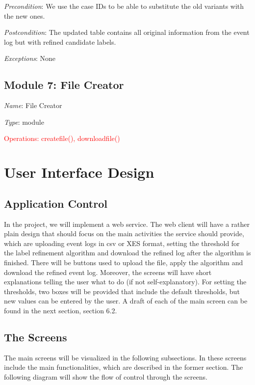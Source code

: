 \documentclass[notitlepage]{article}
\begin{document}
\begin{flushleft}
\textit{Precondition}: We use the case IDs to be able to substitute the old variants with the new ones.

\textit{Postcondition}: The updated table contains all original information from the event log but with refined candidate labels.

\textit{Exceptions}: None
\par
\endgroup




\subsection{Module 7: File Creator}
\textit{Name}: File Creator

\textit{Type}: module

\textcolor{red}{Operations: createfile(), downloadfile()}






\section{User Interface Design}
\subsection{Application Control}

In the project, we will implement a web service. The web client will have a rather plain design that should focus on the main activities the service should provide, which are uploading event logs in csv or XES format, setting the threshold for the label refinement algorithm and download the refined log after the algorithm is finished. There will be buttons used to upload the file, apply the algorithm and download the refined event log. Moreover, the screens will have short explanations telling the user what to do (if not self-explanatory). For setting the thresholds, two boxes will be provided that include the default thresholds, but new values can be entered by the user. A draft of each of the main screen can be found in the next section, section 6.2.

\subsection{The Screens}

The main screens will be visualized in the following subsections. In these screens include the main functionalities, which are described in the former section. The following diagram will show the flow of control through the screens.  


\end{flushleft}
\end{document}
